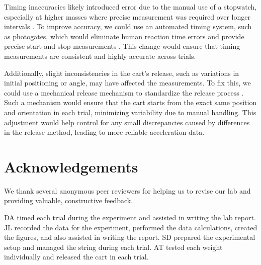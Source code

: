 ﻿\documentclass[reprint,amsmath,amssymb,aps]{revtex4-2}
\begin{document}
Timing inaccuracies likely introduced error due to the manual use of a stopwatch, especially at higher masses where precise measurement was required over longer intervals \cite{hetzler2008reliability}. To improve accuracy, we could use an automated timing system, such as photogates, which would eliminate human reaction time errors and provide precise start and stop measurements \cite{taylor1997introduction}. This change would ensure that timing measurements are consistent and highly accurate across trials. 

Additionally, slight inconsistencies in the cart’s release, such as variations in initial positioning or angle, may have affected the measurements. To fix this, we could use a mechanical release mechanism to standardize the release process \cite{taylor1997introduction}. Such a mechanism would ensure that the cart starts from the exact same position and orientation in each trial, minimizing variability due to manual handling. This adjustment would help control for any small discrepancies caused by differences in the release method, leading to more reliable acceleration data.





\section{Acknowledgements}
We thank several anonymous peer reviewers for helping us to revise our lab and providing valuable, constructive feedback. 

DA timed each trial during the experiment and assisted in writing the lab report. JL recorded the data for the experiment, performed the data calculations, created the figures, and also assisted in writing the report. SD prepared the experimental setup and managed the string during each trial. AT tested each weight individually and released the cart in each trial. 
\end{document}
